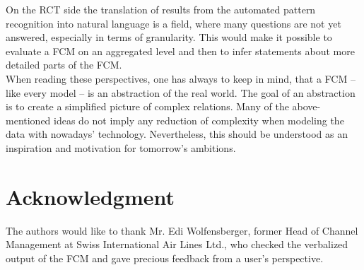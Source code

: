 \documentclass[conference]{IEEEtran}
\begin{document}
On the RCT side the translation of results from the automated pattern recognition into natural language is a field, where many questions are not yet answered, especially in terms of granularity. This would make it possible to evaluate a FCM on an aggregated level and then to infer statements about more detailed parts of the FCM.\\
When reading these perspectives, one has always to keep in mind, that a FCM -- like every model -- is an abstraction of the real world. The goal of an abstraction is to create a simplified picture of complex relations. Many of the above-mentioned ideas do not imply any reduction of complexity when modeling the data with nowadays' technology. Nevertheless, this should be understood as an inspiration and motivation for tomorrow's ambitions.

\section*{Acknowledgment}
The authors would like to thank Mr. Edi Wolfensberger, former Head of Channel Management at Swiss International Air Lines Ltd., who checked the verbalized output of the FCM and gave precious feedback from a user's perspective.



\end{document}

